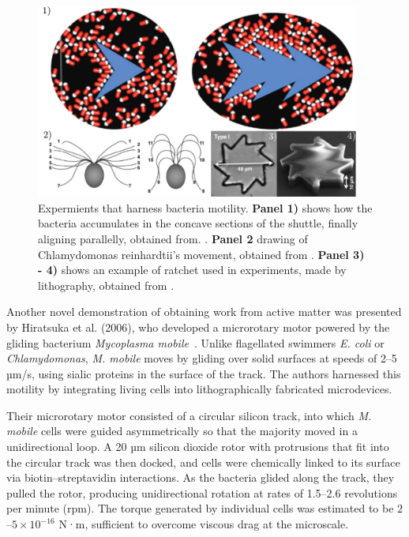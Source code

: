  \begin{figure}[h]
  \begin{center}
    \includegraphics[width=0.95\textwidth]{figures/harnessWork.pdf}
  \end{center}
  \caption[Experiments that harness bacteria motility.]{Expermients that harness bacteria motility. \textbf{Panel 1)} shows how the bacteria accumulates in the concave sections of the shuttle, finally aligning parallelly, obtained from. \cite{angelani2010geometrically}. \textbf{Panel 2} drawing of Chlamydomonas reinhardtii's movement, obtained from \cite{weibel2005microoxen}. \textbf{Panel 3) - 4)} shows an example of ratchet used in experiments, made by lithography, obtained from \cite{di2010bacterial}.}\label{fig:harnesswork}
\end{figure}

Another novel demonstration of obtaining work from active matter was presented by Hiratsuka et al. (2006), who developed a microrotary motor powered by the gliding bacterium \textit{Mycoplasma mobile}~\cite{hiratsuka2006microrotary}. Unlike flagellated swimmers \textit{E. coli} or \textit{Chlamydomonas}, \textit{M. mobile} moves by gliding over solid surfaces at speeds of 2–5 µm/s, using sialic proteins in the surface of the track. The authors harnessed this motility by integrating living cells into lithographically fabricated microdevices.

Their microrotary motor consisted of a circular silicon track, into which \textit{M. mobile} cells were guided asymmetrically so that the majority moved in a unidirectional loop. A 20 µm silicon dioxide rotor with protrusions that fit into the circular track was then docked, and cells were chemically linked to its surface via biotin–streptavidin interactions. As the bacteria glided along the track, they pulled the rotor, producing unidirectional rotation at rates of 1.5–2.6 revolutions per minute (rpm). The torque generated by individual cells was estimated to be $2$–$5\times10^{-16}$ N·m, sufficient to overcome viscous drag at the microscale.

